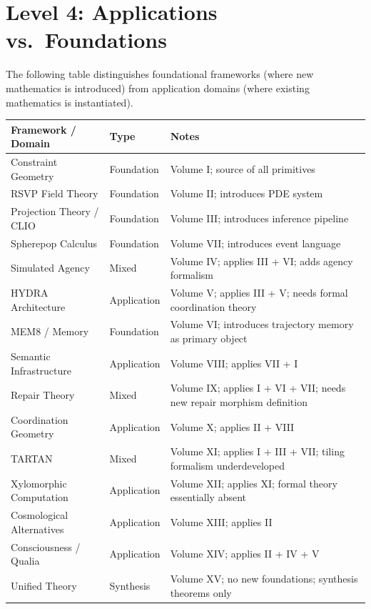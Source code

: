 \documentclass[11pt, a4paper]{article}
\begin{document}
\section{Level 4: Applications vs.\ Foundations}

The following table distinguishes foundational frameworks (where new
mathematics is introduced) from application domains (where existing
mathematics is instantiated).

\medskip
\begin{longtable}{p{4cm}lp{7cm}}
\toprule
\textbf{Framework / Domain} & \textbf{Type} & \textbf{Notes} \\
\midrule
Constraint Geometry & Foundation & Volume I; source of all primitives \\
RSVP Field Theory & Foundation & Volume II; introduces PDE system \\
Projection Theory / CLIO & Foundation & Volume III; introduces inference
  pipeline \\
Spherepop Calculus & Foundation & Volume VII; introduces event language \\
Simulated Agency & Mixed & Volume IV; applies III + VI; adds agency
  formalism \\
HYDRA Architecture & Application & Volume V; applies III + V; needs
  formal coordination theory \\
MEM\textbar{}8 / Memory & Foundation & Volume VI; introduces trajectory
  memory as primary object \\
Semantic Infrastructure & Application & Volume VIII; applies VII + I \\
Repair Theory & Mixed & Volume IX; applies I + VI + VII; needs new
  repair morphism definition \\
Coordination Geometry & Application & Volume X; applies II + VIII \\
TARTAN & Mixed & Volume XI; applies I + III + VII; tiling formalism
  underdeveloped \\
Xylomorphic Computation & Application & Volume XII; applies XI; formal
  theory essentially absent \\
Cosmological Alternatives & Application & Volume XIII; applies II \\
Consciousness / Qualia & Application & Volume XIV; applies II + IV + V \\
Unified Theory & Synthesis & Volume XV; no new foundations; synthesis
  theorems only \\
\bottomrule
\end{longtable}
\end{document}
